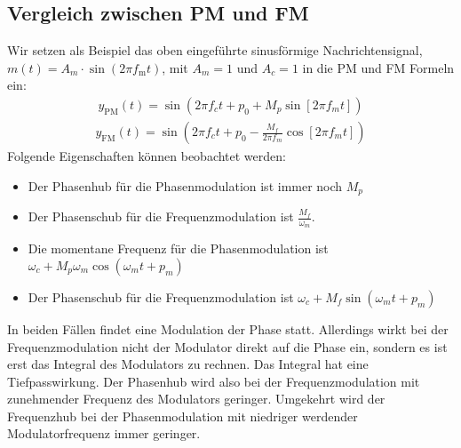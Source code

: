 \documentclass[letterpaper,10pt,english]{jupyterBook}
\begin{document}
\subsection{Vergleich zwischen PM und FM}
\label{\detokenize{content/3_Modulationen:vergleich-zwischen-pm-und-fm}}
\sphinxAtStartPar
Wir setzen als Beispiel das oben eingeführte sinusförmige Nachrichtensignal, \(m(t) = A_{m} \cdot \sin(2\pi f_\mathrm{m} t)\), mit \(A_m=1\) und \(A_c=1\) in die PM und FM Formeln ein:
\begin{equation*}
\begin{split} y_\mathrm{PM}(t) = \sin\left(2\pi f_c t  +p_0 + M_p \sin[2\pi f_m t]\right)\end{split}
\end{equation*}\begin{equation*}
\begin{split}y_\mathrm{FM}(t) = \sin\left(2\pi f_c t + p_0 - \frac{M_f}{2\pi f_m}\cos[2\pi f_m t] \right)\end{split}
\end{equation*}
\sphinxAtStartPar
Folgende Eigenschaften können beobachtet werden:
\begin{itemize}
\item {} 
\sphinxAtStartPar
Der Phasenhub für die Phasenmodulation ist immer noch \(M_{p}\)

\item {} 
\sphinxAtStartPar
Der Phasenschub für die Frequenzmodulation ist \({\frac {M_{f}}{\omega_m}}\).

\item {} 
\sphinxAtStartPar
Die momentane Frequenz für die Phasenmodulation ist \(\omega_c+M_{p}\omega_m\cos(\omega_m t+p_{m})\)

\item {} 
\sphinxAtStartPar
Der Phasenschub für die Frequenzmodulation ist \(\omega_c+M_{f} \sin \left(\omega _{m}t+p_{m}\right)\)

\end{itemize}

\sphinxAtStartPar
In beiden Fällen findet eine Modulation der Phase statt. Allerdings wirkt bei der Frequenzmodulation nicht der Modulator direkt auf die Phase ein, sondern es ist erst das Integral des Modulators zu rechnen. Das Integral hat eine Tiefpasswirkung. Der Phasenhub wird also bei der Frequenzmodulation mit zunehmender Frequenz des Modulators geringer. Umgekehrt wird der Frequenzhub bei der Phasenmodulation mit niedriger werdender Modulatorfrequenz immer geringer.
\end{document}
